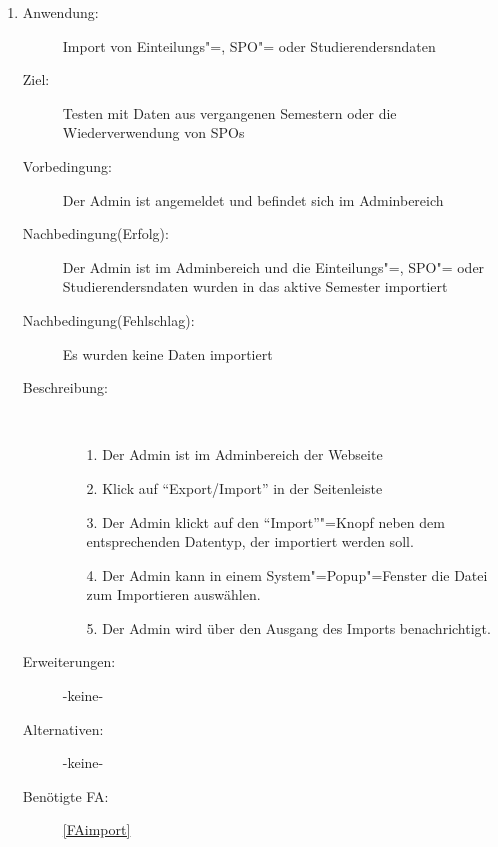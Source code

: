 \documentclass[parskip=full]{scrartcl}
\newcommand{\swtLabel}[1]{\textbf{/#1\arabic*0/}}
\begin{document}
\begin{enumerate} [label=\swtLabel{A}]
    \item \label{UCadminImport}
    \begin{description}
    \item[Anwendung:] Import von \gls{Einteilung}s"=, \gls{SPO}"= oder \glspl{Studierender}ndaten
    \item[Ziel:] Testen mit Daten aus vergangenen Semestern oder die
    Wiederverwendung von \glspl{SPO}
    \item[Vorbedingung:] Der \gls{Admin} ist angemeldet und befindet sich im
    \gls{Admin}bereich
    \item[Nachbedingung(Erfolg):] Der \gls{Admin} ist im \gls{Admin}bereich und die \gls{Einteilung}s"=, \gls{SPO}"= oder \glspl{Studierender}ndaten wurden in das aktive Semester importiert
    \item[Nachbedingung(Fehlschlag):] Es wurden keine Daten importiert
    \item[Beschreibung:]~
    \begin{enumerate}
      \item[1.] Der \gls{Admin} ist im \gls{Admin}bereich der Webseite
      \item[2.] Klick auf \enquote{Export/Import}
      in der Seitenleiste
       \item[3.] Der \gls{Admin} klickt auf den \enquote{Import}"=Knopf neben dem entsprechenden Datentyp, der importiert werden soll.
       \item[4.] Der \gls{Admin} kann in einem System"=Popup"=Fenster die Datei zum Importieren auswählen.
      \item[5.] Der \gls{Admin} wird über den Ausgang des Imports benachrichtigt.
    \end{enumerate}
    \item[Erweiterungen:] -keine-
    \item[Alternativen:] -keine-
    \item[Benötigte FA:] \ref{FAimport}
  \end{description}
  

\end{enumerate}
\end{document}
